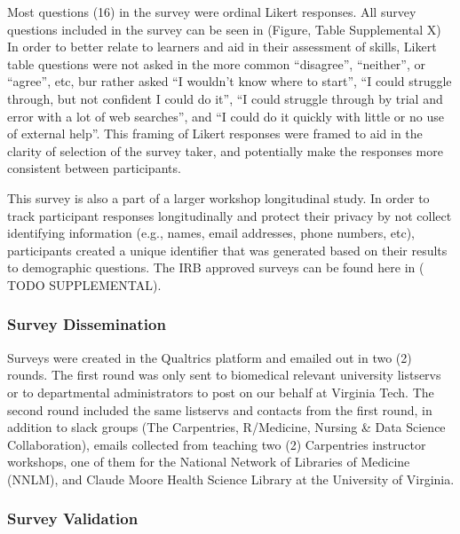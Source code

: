 \documentclass[020-persona\_validation.tex]{subfiles}
\begin{document}
            Most questions (16) in the survey were ordinal Likert responses.
            All survey questions included in the survey can be seen in
            (Figure, Table Supplemental X)
            In order to better relate to learners and aid in their assessment of skills,
            Likert table questions were not asked in the more common
            ``disagree'', ``neither'', or ``agree'', etc,
            bur rather asked
            ``I wouldn't know where to start'',
            ``I could struggle through, but not confident I could do it'',
            ``I could struggle through by trial and error with a lot of web searches'',
            and
            ``I could do it quickly with little or no use of external help''.
            This framing of Likert responses were framed to aid in the clarity of selection of the survey taker,
            and potentially make the responses more consistent between participants.
    
            This survey is also a part of a larger workshop longitudinal study.
            In order to track participant responses longitudinally and protect their privacy by not collect identifying information
            (e.g., names, email addresses, phone numbers, etc),
            participants created a unique identifier that was generated based on their results to demographic questions.
            The IRB approved surveys can be found here in ( TODO SUPPLEMENTAL).
        
        \subsubsection{Survey Dissemination}

            Surveys were created in the Qualtrics platform and emailed out in two (2) rounds.
            The first round was only sent to biomedical relevant university listservs
            or to departmental administrators to post on our behalf at Virginia Tech.
            The second round included the same listservs and contacts from the first round,
            in addition to slack groups (The Carpentries, R/Medicine, Nursing \& Data Science Collaboration),
            emails collected from teaching two (2) Carpentries instructor workshops,
            one of them for the National Network of Libraries of Medicine (NNLM),
            and
            Claude Moore Health Science Library at the University of Virginia.

        \subsubsection{Survey Validation}
    
\end{document}
